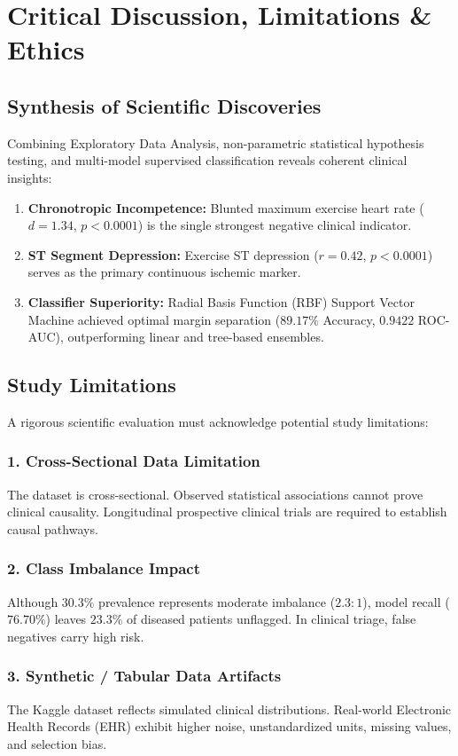 \chapter{Critical Discussion, Limitations \& Ethics}

\section{Synthesis of Scientific Discoveries}
Combining Exploratory Data Analysis, non-parametric statistical hypothesis testing, and multi-model supervised classification reveals coherent clinical insights:
\begin{enumerate}
    \item \textbf{Chronotropic Incompetence:} Blunted maximum exercise heart rate ($d = 1.34$, $p < 0.0001$) is the single strongest negative clinical indicator.
    \item \textbf{ST Segment Depression:} Exercise ST depression ($r = 0.42$, $p < 0.0001$) serves as the primary continuous ischemic marker.
    \item \textbf{Classifier Superiority:} Radial Basis Function (RBF) Support Vector Machine achieved optimal margin separation ($89.17\%$ Accuracy, $0.9422$ ROC-AUC), outperforming linear and tree-based ensembles.
\end{enumerate}

\section{Study Limitations}
A rigorous scientific evaluation must acknowledge potential study limitations:

\subsection{1. Cross-Sectional Data Limitation}
The dataset is cross-sectional. Observed statistical associations cannot prove clinical causality. Longitudinal prospective clinical trials are required to establish causal pathways.

\subsection{2. Class Imbalance Impact}
Although $30.3\%$ prevalence represents moderate imbalance ($2.3:1$), model recall ($76.70\%$) leaves $23.3\%$ of diseased patients unflagged. In clinical triage, false negatives carry high risk.

\subsection{3. Synthetic / Tabular Data Artifacts}
The Kaggle dataset reflects simulated clinical distributions. Real-world Electronic Health Records (EHR) exhibit higher noise, unstandardized units, missing values, and selection bias.

